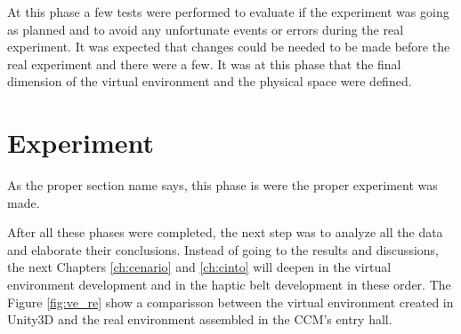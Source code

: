         At this phase a few tests were performed to evaluate if the experiment was going as planned and to avoid any unfortunate events or errors during the real experiment. It was expected that changes could be needed to be made before the real experiment and there were a few. It was at this phase that the final dimension of the virtual environment and the physical space were defined.

\section{Experiment}
\label{sec:experiment}
        
        As the proper section name says, this phase is were the proper experiment was made.

After all these phases were completed, the next step was to analyze all the data and elaborate their conclusions. Instead of going to the results and discussions, the next Chapters \ref{ch:cenario} and \ref{ch:cinto} will deepen in the virtual environment development and in the haptic belt development in these order. The Figure \ref{fig:ve_re} show a comparisson between the virtual environment created in Unity3D and the real environment assembled in the CCM's entry hall.

%

